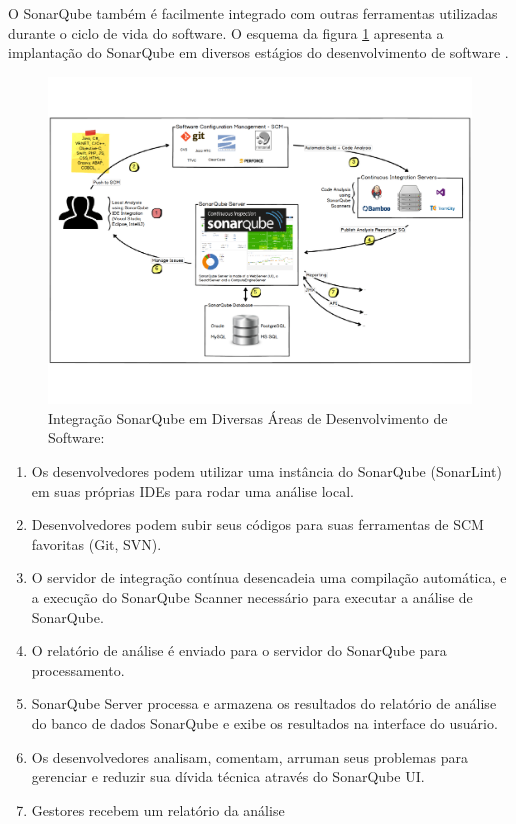 O SonarQube também é facilmente integrado com outras ferramentas utilizadas durante o ciclo de vida do software. O esquema da figura \ref{img:sonar_int} apresenta a implantação do SonarQube em diversos estágios do desenvolvimento de software \cite{sonar}.
\graphicspath{{figuras/}}
\begin{figure}[h]
\centering
\includegraphics[scale=0.5]{sonar_int}
\caption{Integração SonarQube em Diversas Áreas de Desenvolvimento de Software: \cite{sonar}}
\label{img:sonar_int}
\end{figure}
\begin{enumerate}
\item Os desenvolvedores podem utilizar uma instância do SonarQube (SonarLint) em suas próprias IDEs para rodar uma análise local.
\item Desenvolvedores podem subir seus códigos para suas ferramentas de SCM favoritas (Git, SVN).
\item O servidor de integração contínua desencadeia uma compilação automática, e a execução do SonarQube Scanner necessário para executar a análise de SonarQube.
\item O relatório de análise é enviado para o servidor do SonarQube para processamento.
\item SonarQube Server processa e armazena os resultados do relatório de análise do banco de dados SonarQube e exibe os resultados na interface do usuário.
\item Os desenvolvedores analisam, comentam, arruman seus problemas para gerenciar e reduzir sua dívida técnica através do SonarQube UI.
\item Gestores recebem um relatório da análise
\end{enumerate}

